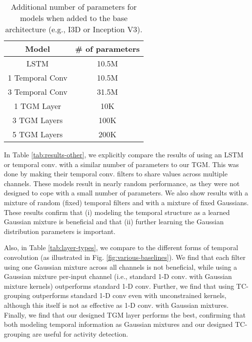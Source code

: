 \documentclass{article}
\begin{document}
\begin{table}
\caption{Additional number of parameters for models when added to the base architecture (e.g., I3D or Inception V3).}
\label{tab:parameters}
\centering
\begin{tabular}{c|c}
\toprule
Model & \# of parameters \\
\midrule
LSTM              & 10.5M \\
1 Temporal Conv   & 10.5M \\
3 Temporal Conv   & 31.5M \\
1 TGM Layer       & 10K \\
3 TGM Layers      & 100K \\
5 TGM Layers      & 200K \\
\bottomrule
\end{tabular}
\end{table}

In Table \ref{tab:results-other}, we explicitly compare the results of using an LSTM or temporal conv. with a similar number of parameters to our TGM. This was done by making their temporal conv. filters to share values across multiple channels. These models result in nearly random performance, as they were not designed to cope with a small number of parameters.
We also show results with a mixture of random (fixed) temporal filters and with a mixture of fixed Gaussians. These results confirm that (i) modeling the temporal structure as a learned Gaussian mixture is beneficial and that (ii) further learning the Gaussian distribution parameters is important.

Also, in Table \ref{tab:layer-types}, we compare to the different forms of temporal convolution (as illustrated in Fig. \ref{fig:various-baselines}). We find that each filter using one Gaussian mixture across all channels is not beneficial, while using a Gaussian mixture per-input channel (i.e., standard 1-D conv. with Gaussian mixture kernels) outperforms standard 1-D conv. Further, we find that using TC-grouping outperforms standard 1-D conv even with unconstrained kernels, although this itself is not as effective as 1-D conv. with Gaussian mixtures. Finally, we find that our designed TGM layer performs the best, confirming that both modeling temporal information as Gaussian mixtures and our designed TC-grouping are useful for activity detection.
\end{document}
